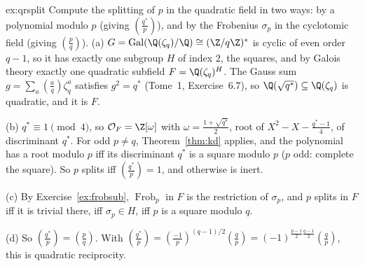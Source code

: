 \begin{solution}{ex:qrsplit}
\idea Compute the splitting of $p$ in the quadratic field in two ways: by a polynomial modulo $p$ (giving
$\left(\frac{q^*}p\right)$), and by the Frobenius $\sigma_p$ in the cyclotomic field (giving $\left(\frac pq\right)$).
\writeup (a) $G=\operatorname{Gal}(\Q(\zeta_q)/\Q)\cong(\Z/q\Z)^*$ is cyclic of even order $q-1$, so it has exactly one
subgroup $H$ of index $2$, the squares, and by Galois theory exactly one quadratic subfield $F=\Q(\zeta_q)^H$. The Gauss
sum $g=\sum_a\left(\frac aq\right)\zeta_q^a$ satisfies $g^2=q^*$ (Tome~1, Exercise~6.7), so $\Q(\sqrt{q^*})\subseteq
\Q(\zeta_q)$ is quadratic, and it is $F$.

(b) $q^*\equiv1\pmod 4$, so $\mathcal O_F=\Z[\omega]$ with $\omega=\frac{1+\sqrt{q^*}}2$, root of $X^2-X-\frac{q^*-1}4$, of
discriminant $q^*$. For odd $p\ne q$, Theorem~\ref{thm:kd} applies, and the polynomial has a root modulo $p$ iff its
discriminant $q^*$ is a square modulo $p$ ($p$ odd: complete the square). So $p$ splits iff $\left(\frac{q^*}p\right)=1$,
and otherwise is inert.

(c) By Exercise~\ref{ex:frobsub}, $\operatorname{Frob}_p$ in $F$ is the restriction of $\sigma_p$, and $p$ splits in $F$
iff it is trivial there, iff $\sigma_p\in H$, iff $p$ is a square modulo $q$.

(d) So $\left(\frac{q^*}p\right)=\left(\frac pq\right)$. With $\left(\frac{q^*}p\right)=\left(\frac{-1}p\right)^{(q-1)/2}
\left(\frac qp\right)=(-1)^{\frac{p-1}2\frac{q-1}2}\left(\frac qp\right)$, this is quadratic reciprocity.
\end{solution}

